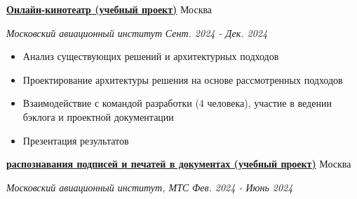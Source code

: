 \documentclass[14pt, a4paper, oneside]{extarticle}
\begin{document}

\begin{flushleft}
	\vspace{-\intextsep}
	\quad
	\href{https://github.com/Crazy5202/Python_project}{\textbf{Онлайн-кинотеатр (учебный проект)}}
	\hfill
	Москва
\end{flushleft}

\begin{flushleft}
	\vspace{-1\intextsep}
	\quad
	\textit{Московский авиационный институт}
	\hfill
	\textit{\small Сент. 2024 - Дек. 2024}
\end{flushleft}


\begin{itemize}
	\vspace{-2\intextsep}
	\item Анализ существующих решений и архитектурных подходов
	\vspace{-0.8\intextsep}
	\item Проектирование архитектуры решения на основе рассмотренных подходов
	\vspace{-0.8\intextsep}
    \item Взаимодействие с командой разработки (4 человека), участие в ведении
    бэклога и проектной документации
    \vspace{-0.8\intextsep}
    \item Презентация результатов
\end{itemize}


\begin{flushleft}
	\vspace{-0.8\intextsep}
	\quad
	\href{https://github.com/Crazy5202/CM_2024}{\textbf{ распознавания подписей и печатей в документах (учебный проект)}}
	\hfill
	Москва
\end{flushleft}

\begin{flushleft}
	\vspace{-1\intextsep}
	\quad
	\textit{Московский авиационный институт, МТС}
	\hfill
	\textit{\small Фев. 2024 - Июнь 2024}
\end{flushleft}

\end{document}
